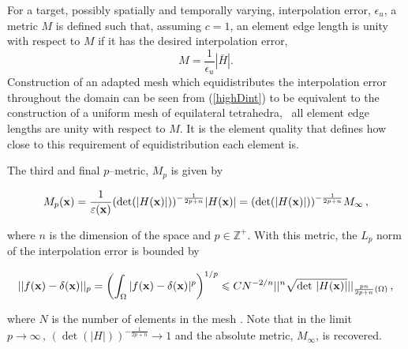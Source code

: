 For a target, possibly spatially and temporally varying, interpolation
error, $\epsilon_u$, a metric $M$ is defined such that, assuming
$c=1$, an element edge length is unity with respect to $M$ if it has
the desired interpolation error, \ie\
\begin{equation}
  M = \frac{1}{\epsilon_u} {|\bar{H}|}.
  \label{eqn:ME}
\end{equation}
Construction of an adapted mesh which equidistributes the
interpolation error throughout the domain can be seen from
(\ref{highDint}) to be equivalent to the construction of a uniform
mesh of equilateral tetrahedra, \ie\ all element edge lengths are
unity with respect to $M$. It is the element quality that defines how
close to this requirement of equidistribution each element is.

The third and final $p$--metric, $M_p$ is given by \citep{adaptivity_chen_07}

\begin{equation}\label{eq:metric_l2}
M_p({\bf x}) = \frac{1}{\epsilon({\bf x})}(\det(|H({\bf
x})|))^{-\frac{1}{2p+n}}|H({\bf x})| = (\det(|H({\bf
x})|))^{-\frac{1}{2p+n}}M_\infty \, ,
\end{equation}

where $n$ is the dimension of the space and $p \in \mathbb{Z}^+$. With
this metric, the $L_p$ norm of the interpolation error is bounded by

\begin{equation}
||f({\bf x})-\delta({\bf x})||_p = \left( \int_\Omega |f({\bf
x})-\delta({\bf x})|^{p} \right) ^{1/p} \leq CN^{-2/n}||^n \sqrt{\det
\, |H({\bf x})|}||_{\frac{pn}{2p+n}(\Omega)} \, ,
\end{equation}

where $N$ is the number of elements in the mesh \citep[also
cf.][]{adaptivity_loseille_10-ii}. Note that in the limit \mbox{$p \to
\infty\, , \, (\det(|H|))^{-\frac{1}{2p+n}} \to 1$} and the absolute
metric,  $M_\infty$, is recovered.

